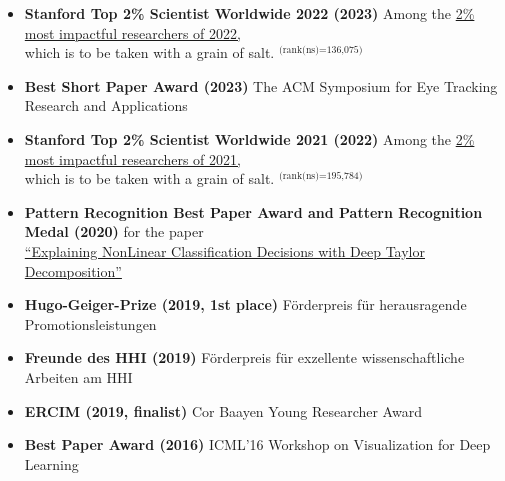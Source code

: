 
\begin{itemize}
    \item [] \textbf{Stanford Top 2\% Scientist Worldwide 2022 (2023)}
    Among the \href{https://elsevier.digitalcommonsdata.com/datasets/btchxktzyw/6}{2\% most impactful researchers of 2022,}\\
    {\vphantom{}\qquad which is to be taken with a grain of salt. $^\text{(rank(ns)=136,075)}$
    }

    \item[] \textbf{Best Short Paper Award (2023)}
    The ACM Symposium for Eye Tracking Research and Applications

    \item [] \textbf{Stanford Top 2\% Scientist Worldwide 2021 (2022)}
    Among the \href{https://elsevier.digitalcommonsdata.com/datasets/btchxktzyw/4}{2\% most impactful researchers of 2021,}\\
    {\vphantom{}\qquad which is to be taken with a grain of salt. $^\text{(rank(ns)=195,784)}$}

    \item[] \textbf{Pattern Recognition Best Paper Award and Pattern Recognition Medal (2020)}
    for the paper\\
    \href{https://doi.org/10.1016/j.patcog.2016.11.008}{\qquad ``Explaining NonLinear Classification Decisions with Deep Taylor Decomposition''}

    \item[] \textbf{Hugo-Geiger-Prize (2019, 1st place)}
    F\"orderpreis f\"ur herausragende Promotionsleistungen
    
    \item[] \textbf{Freunde des HHI (2019)}
    F\"orderpreis f\"ur exzellente wissenschaftliche Arbeiten am HHI
    
    \item[] \textbf{ERCIM (2019, finalist)}
    Cor Baayen Young Researcher Award

    \item[] \textbf{Best Paper Award (2016)}
    ICML'16 Workshop on Visualization for Deep Learning
\end{itemize}
